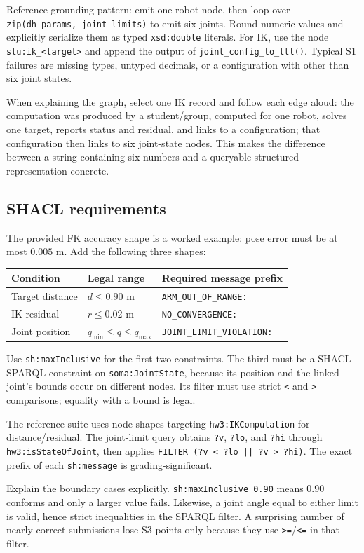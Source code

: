 \documentclass[11pt]{article}
\newcommand{\code}[1]{\nolinkurl{#1}}
\begin{document}
\begin{tutornote}
Reference grounding pattern: emit one robot node, then loop over
\code{zip(dh_params, joint_limits)} to emit six joints. Round numeric values
and explicitly serialize them as typed \code{xsd:double} literals. For IK,
use the node \code{stu:ik_<target>} and append the output of
\code{joint_config_to_ttl()}. Typical S1 failures are missing types, untyped
decimals, or a configuration with other than six joint states.

When explaining the graph, select one IK record and follow each edge aloud:
the computation was produced by a student/group, computed for one robot,
solves one target, reports status and residual, and links to a configuration;
that configuration then links to six joint-state nodes. This makes the
difference between a string containing six numbers and a queryable structured
representation concrete.
\end{tutornote}

\subsection{SHACL requirements}

The provided FK accuracy shape is a worked example: pose error must be at most
$0.005$ m. Add the following three shapes:

{\renewcommand{\arraystretch}{1.2}
\begin{longtable}{L{.27\linewidth}L{.23\linewidth}L{.39\linewidth}}
\toprule
\textbf{Condition} & \textbf{Legal range} & \textbf{Required message prefix}\\
\midrule
Target distance & $d\leq0.90$ m & \code{ARM_OUT_OF_RANGE:}\\
IK residual & $r\leq0.02$ m & \code{NO_CONVERGENCE:}\\
Joint position & $q_{\min}\leq q\leq q_{\max}$ & \code{JOINT_LIMIT_VIOLATION:}\\
\bottomrule
\end{longtable}}

Use \code{sh:maxInclusive} for the first two constraints. The third must be a
SHACL--SPARQL constraint on \code{soma:JointState}, because its position and
the linked joint's bounds occur on different nodes. Its filter must use strict
\code{<} and \code{>} comparisons; equality with a bound is legal.

\begin{tutornote}
The reference suite uses node shapes targeting \code{hw3:IKComputation} for
distance/residual. The joint-limit query obtains \code{?v}, \code{?lo}, and
\code{?hi} through \code{hw3:isStateOfJoint}, then applies
\code{FILTER (?v < ?lo || ?v > ?hi)}. The exact prefix of each
\code{sh:message} is grading-significant.

Explain the boundary cases explicitly. \code{sh:maxInclusive 0.90} means
$0.90$ conforms and only a larger value fails. Likewise, a joint angle equal
to either limit is valid, hence strict inequalities in the SPARQL filter. A
surprising number of nearly correct submissions lose S3 points only because
they use \code{>=}/\code{<=} in that filter.
\end{tutornote}
\end{document}
